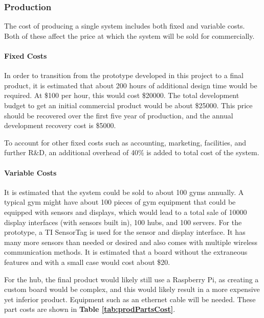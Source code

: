 \documentclass[PPFS.tex]{template/subfiles}
\begin{document}
        \subsubsection{Production}
        The cost of producing a single system includes both fixed and variable costs. Both of these affect the price at which the system will be sold for commercially.
        
        \paragraph{Fixed Costs}	
        In order to transition from the prototype developed in this project to a final product, it is estimated that about 200 hours of additional design time would be required. At \$100 per hour, this would cost \$20000. The total development budget to get an initial commercial product would be about \$25000. This price should be recovered over the first five year of production, and the annual development recovery cost is \$5000.
        
        To account for other fixed costs such as accounting, marketing, facilities, and further R\&D, an additional overhead of 40\% is added to total cost of the system.
        
        \paragraph{Variable Costs}
        
        It is estimated that the system could be sold to about 100 gyms annually. A typical gym might have about 100 pieces of gym equipment that could be equipped with sensors and displays, which would lead to a total sale of 10000 display interfaces (with sensors built in), 100 hubs, and 100 servers. 
        For the prototype, a TI SensorTag is used for the sensor and display interface. It has many more sensors than needed or desired and also comes with multiple wireless communication methods. It is estimated that a board without the extraneous features and with a small case would cost about \$20.
        
        For the hub, the final product would likely still use a Raspberry Pi, as creating a custom board would be complex, and this would likely result in a more expensive yet inferior product. Equipment such as an ethernet cable will be needed.
        These part costs are shown in \textbf{Table \ref{tab:prodPartsCost}}.
        
\end{document}
